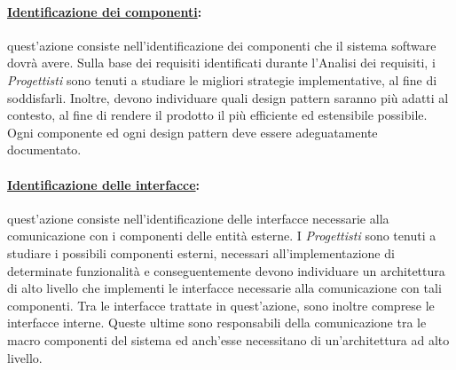 \paragraph{\underline{Identificazione dei componenti}:} quest'azione consiste nell'identificazione dei componenti che il sistema software dovrà avere. Sulla base dei requisiti identificati durante l'Analisi dei requisiti, i \textit{Progettisti} sono tenuti a studiare le migliori strategie implementative, al fine di soddisfarli. Inoltre, devono individuare quali design pattern\g{} saranno più adatti al contesto, al fine di rendere il prodotto il più efficiente ed estensibile possibile. Ogni componente ed ogni design pattern\g{} deve essere adeguatamente documentato.

\paragraph{\underline{Identificazione delle interfacce}:} quest'azione consiste nell'identificazione delle interfacce necessarie alla comunicazione con i componenti delle entità esterne. I \textit{Progettisti} sono tenuti a studiare i possibili componenti esterni, necessari all'implementazione di determinate funzionalità e conseguentemente devono individuare un architettura di alto livello che implementi le interfacce necessarie alla comunicazione con tali componenti. Tra le interfacce trattate in quest'azione, sono inoltre comprese le interfacce interne. Queste ultime sono responsabili della comunicazione tra le macro componenti del sistema ed anch'esse necessitano di un'architettura ad alto livello.

